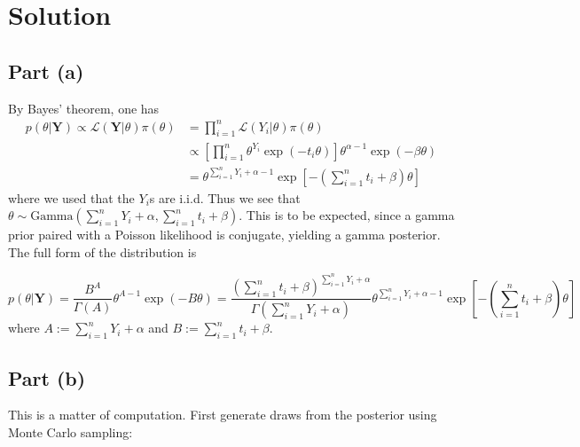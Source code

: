\documentclass[
]{homework}
\begin{document}
\section{Solution}\label{solution}

\subsection{Part (a)}\label{part-a}

By Bayes' theorem, one has
\begin{align*}
p(\theta | \mathbf Y) 
   \propto \mathcal L(\mathbf Y | \theta) \pi(\theta) 
  &= \prod_{i = 1}^n \mathcal L(Y_i | \theta) \pi(\theta) \\
  &\propto \left[\prod_{i = 1}^n \theta^{Y_i} \exp(-t_i\theta)\right] \theta^{\alpha - 1} \exp(-\beta\theta) \\
  &= \theta^{\sum_{i = 1}^n Y_i + \alpha - 1} \exp\left[- \left(\sum_{i = 1}^n t_i + \beta\right)\theta\right]
\end{align*}
where we used that the \(Y_i\)s are i.i.d. Thus we see that \(\theta \sim \mathrm{Gamma}\left(\sum_{i = 1}^n Y_i + \alpha, \sum_{i = 1}^n t_i + \beta\right)\). This is to be expected, since a gamma prior paired with a Poisson likelihood is conjugate, yielding a gamma posterior. The full form of the distribution is

\[
  p(\theta | \mathbf Y) = \frac{B^A}{\Gamma(A)} \theta^{A - 1} \exp(-B\theta) = \frac{\left(\sum_{i = 1}^n t_i + \beta\right)^{\sum_{i = 1}^n Y_i + \alpha}}{\Gamma\left(\sum_{i = 1}^n Y_i + \alpha\right)} \theta^{\sum_{i = 1}^n Y_i + \alpha - 1} \exp\left[- \left(\sum_{i = 1}^n t_i + \beta\right)\theta\right]
\]
where \(A := \sum_{i = 1}^n Y_i + \alpha\) and \(B := \sum_{i = 1}^n t_i + \beta\).

\subsection{Part (b)}\label{part-b}

This is a matter of computation. First generate draws from the posterior using Monte Carlo sampling:
\end{document}
